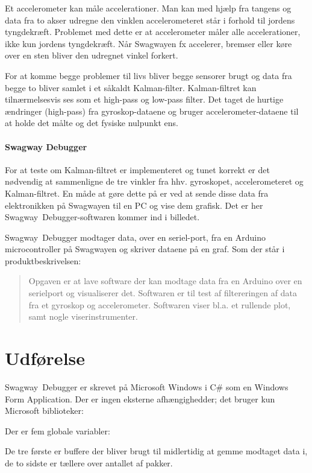 \documentclass[a4paper,oneside,article,danish,table]{memoir}
\newcommand{\form}[2]{}
\begin{document}
Et accelerometer kan måle accelerationer. Man kan med hjælp fra tangens og data fra to akser udregne den vinklen accelerometeret står i forhold til jordens tyngdekræft. Problemet med dette er at accelerometer måler alle accelerationer, ikke kun jordens tyngdekræft. Når Swagwayen fx accelerer, bremser eller køre over en sten bliver den udregnet vinkel forkert.

For at komme begge problemer til livs bliver begge sensorer brugt og data fra begge to bliver samlet i et såkaldt Kalman-filter. Kalman-filtret kan tilnærmelsesvis ses som et high-pass og low-pass filter. Det taget de hurtige ændringer (high-pass) fra gyroskop-dataene og bruger accelerometer-dataene til at holde det målte og det fysiske nulpunkt ens.

\subsubsection{Swagway Debugger}
For at teste om Kalman-filtret er implementeret og tunet korrekt er det nødvendig at sammenligne de tre vinkler fra hhv. gyroskopet, accelerometeret og Kalman-filtret. En måde at gøre dette på er ved at sende disse data fra elektronikken på Swagwayen til en PC og vise dem grafisk. Det er her Swagway~Debugger-softwaren kommer ind i billedet.

Swagway~Debugger modtager data, over en seriel-port, fra en Arduino microcontroller på Swagwayen og skriver dataene på en graf. Som der står i produktbeskrivelsen:
\begin{quotation}
  Opgaven er at lave software der kan modtage data fra en Arduino over en serielport og visualiserer det. Softwaren er til test af filtereringen af data fra et gyroskop og accelerometer. Softwaren viser bl.a. et rullende plot, samt nogle viserinstrumenter.
\end{quotation}

\chapter{Udførelse}
Swagway~Debugger er skrevet på Microsoft Windows i C\# som en Windows Form Application. Der er ingen eksterne afhængighedder; det bruger kun Microsoft biblioteker:
\form{9}{12}
Der er fem globale variabler:
\form{18}{23}
De tre første er buffere der bliver brugt til midlertidig at gemme modtaget data i, de to sidste er tællere over antallet af pakker.
\end{document}
